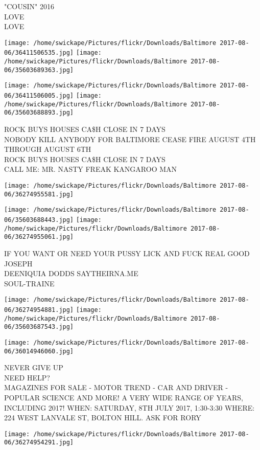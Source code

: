\documentclass[10pt,letterpaper]{article}
\begin{document}
"COUSIN" 2016\\
LOVE\\
LOVE
\pagebreak

\texttt{[image: /home/swickape/Pictures/flickr/Downloads/Baltimore 2017-08-06/36411506535.jpg]}
\texttt{[image: /home/swickape/Pictures/flickr/Downloads/Baltimore 2017-08-06/35603689363.jpg]}

\texttt{[image: /home/swickape/Pictures/flickr/Downloads/Baltimore 2017-08-06/36411506005.jpg]}
\texttt{[image: /home/swickape/Pictures/flickr/Downloads/Baltimore 2017-08-06/35603688893.jpg]}

ROCK BUYS HOUSES CA\$H CLOSE IN 7 DAYS\\
NOBODY KILL ANYBODY FOR BALTIMORE CEASE FIRE AUGUST 4TH THROUGH AUGUST 6TH\\
ROCK BUYS HOUSES CA\$H CLOSE IN 7 DAYS\\
CALL ME: MR. NASTY FREAK KANGAROO MAN
\pagebreak

\texttt{[image: /home/swickape/Pictures/flickr/Downloads/Baltimore 2017-08-06/36274955581.jpg]}

\vspace{0.25in}
\texttt{[image: /home/swickape/Pictures/flickr/Downloads/Baltimore 2017-08-06/35603688443.jpg]}
\texttt{[image: /home/swickape/Pictures/flickr/Downloads/Baltimore 2017-08-06/36274955061.jpg]}

IF YOU WANT OR NEED YOUR PUSSY LICK AND FUCK REAL GOOD JOSEPH\\
DEENIQUIA DODDS SAYTHEIRNA.ME\\
SOUL{-}TRAINE
\pagebreak

\texttt{[image: /home/swickape/Pictures/flickr/Downloads/Baltimore 2017-08-06/36274954881.jpg]}
\texttt{[image: /home/swickape/Pictures/flickr/Downloads/Baltimore 2017-08-06/35603687543.jpg]}

\texttt{[image: /home/swickape/Pictures/flickr/Downloads/Baltimore 2017-08-06/36014946060.jpg]}

NEVER GIVE UP\\
NEED HELP?\\
MAGAZINES FOR SALE {-} MOTOR TREND {-} CAR AND DRIVER {-} POPULAR SCIENCE AND MORE!  A VERY WIDE RANGE OF YEARS, INCLUDING 2017!  WHEN: SATURDAY, 8TH JULY 2017, 1:30{-}3:30 WHERE: 224 WEST LANVALE ST, BOLTON HILL.  ASK FOR RORY
\pagebreak

\texttt{[image: /home/swickape/Pictures/flickr/Downloads/Baltimore 2017-08-06/36274954291.jpg]}
\end{document}

